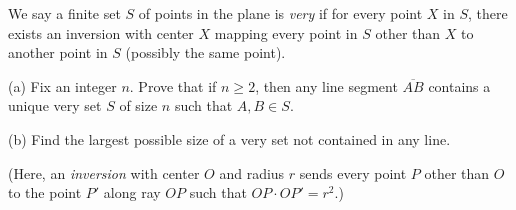 We say a finite set $S$ of points in the plane is \textit{very} if for every point $X$ in $S$, there exists an inversion with center $X$ mapping every point in $S$ other than $X$ to another point in $S$ (possibly the same point).

(a) Fix an integer $n$. Prove that if $n \ge 2$, then any line segment $\overline{AB}$ contains a unique very set $S$ of size $n$ such that $A, B \in S$.

(b) Find the largest possible size of a very set not contained in any line.

(Here, an \textit{inversion} with center $O$ and radius $r$ sends every point $P$ other than $O$ to the point $P'$ along ray $OP$ such that $OP\cdot OP' = r^2$.)

